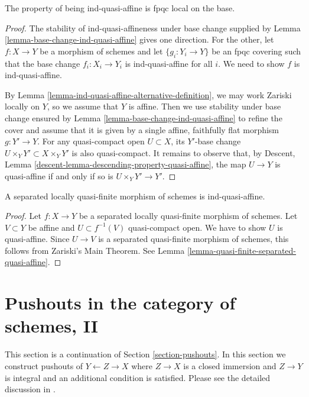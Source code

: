 \begin{lemma}
\label{lemma-descending-property-ind-quasi-affine}
The property of being ind-quasi-affine is fpqc local on the base.
\end{lemma}

\begin{proof}
The stability of ind-quasi-affineness under base change
supplied by Lemma \ref{lemma-base-change-ind-quasi-affine}
gives one direction. For the other, let $f : X \to Y$
be a morphism of schemes and let $\{g_i : Y_i \to Y\}$
be an fpqc covering such that the base change $f_i : X_i \to Y_i$
is ind-quasi-affine for all $i$. We need to show $f$ is ind-quasi-affine.

\medskip\noindent
By Lemma \ref{lemma-ind-quasi-affine-alternative-definition}, we may work
Zariski locally on $Y$, so we assume that $Y$ is affine.
Then we use stability under base change ensured by
Lemma \ref{lemma-base-change-ind-quasi-affine} to refine the cover
and assume that it is given by a single affine, faithfully flat morphism
$g : Y' \to Y$. For any quasi-compact open $U \subset X$, its
$Y'$-base change $U \times_Y Y' \subset X \times_Y Y'$ is also quasi-compact.
It remains to observe that, by
Descent, Lemma \ref{descent-lemma-descending-property-quasi-affine},
the map $U \to Y$ is quasi-affine if and only if so is $U \times_Y Y' \to Y'$.
\end{proof}

\begin{lemma}
\label{lemma-etale-separated-ind-quasi-affine}
A separated locally quasi-finite morphism of schemes is ind-quasi-affine.
\end{lemma}

\begin{proof}
Let $f : X \to Y$ be a separated locally quasi-finite morphism of schemes.
Let $V \subset Y$ be affine and $U \subset f^{-1}(V)$ quasi-compact
open. We have to show $U$ is quasi-affine. Since $U \to V$ is a
separated quasi-finite morphism of schemes, this follows from
Zariski's Main Theorem. See
Lemma \ref{lemma-quasi-finite-separated-quasi-affine}.
\end{proof}




\section{Pushouts in the category of schemes, II}
\label{section-pushouts-II}

\noindent
This section is a continuation of Section \ref{section-pushouts}.
In this section we construct pushouts of $Y \leftarrow Z \rightarrow X$
where $Z \to X$ is a closed immersion and $Z \to Y$ is integral and
an additional condition is satisfied.
Please see the detailed discussion in \cite{Ferrand-Conducteur}.

